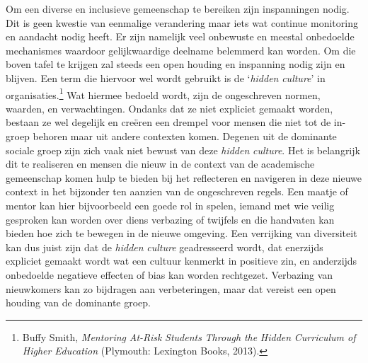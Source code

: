 \documentclass[smallauthor, chapterhaspagenum, nochapterinheader, pagenuminheader,  bigchapnum,medium2, tocpages,  garamond, titleinheader]{jote-book}
\begin{document}
	Om een diverse en inclusieve gemeenschap te bereiken zijn inspanningen nodig. Dit is geen kwestie van eenmalige verandering maar iets wat continue monitoring en aandacht nodig heeft. Er zijn namelijk veel onbewuste en meestal onbedoelde mechanismes waardoor gelijkwaardige deelname belemmerd kan worden. Om die boven tafel te krijgen zal steeds een open houding en inspanning nodig zijn en blijven. Een term die hiervoor wel wordt gebruikt is de ‘\emph{hidden}\emph{ culture}' in organisaties.\footnote{Buffy Smith, \emph{Mentoring}\emph{ At-Risk }\emph{Students}\emph{ Through }\emph{the}\emph{ }\emph{Hidden}\emph{ Curriculum of }\emph{Higher}\emph{ }\emph{Education}\emph{ }(Plymouth: Lexington Books, 2013).} Wat hiermee bedoeld wordt, zijn de ongeschreven normen, waarden, en verwachtingen. Ondanks dat ze niet expliciet gemaakt worden, bestaan ze wel degelijk en creëren een drempel voor mensen die niet tot de in-groep behoren maar uit andere contexten komen. Degenen uit de dominante sociale groep zijn zich vaak niet bewust van deze \emph{hidden}\emph{ culture}. Het is belangrijk dit te realiseren en mensen die nieuw in de context van de academische gemeenschap komen hulp te bieden bij het reflecteren en navigeren in deze nieuwe context in het bijzonder ten aanzien van de ongeschreven regels. Een maatje of mentor kan hier bijvoorbeeld een goede rol in spelen, iemand met wie veilig gesproken kan worden over diens verbazing of twijfels en die handvaten kan bieden hoe zich te bewegen in de nieuwe omgeving. Een verrijking van diversiteit kan dus juist zijn dat de \emph{hidden}\emph{ culture} geadresseerd wordt, dat enerzijds expliciet gemaakt wordt wat een cultuur kenmerkt in positieve zin, en anderzijds onbedoelde negatieve effecten of bias kan worden rechtgezet. Verbazing van nieuwkomers kan zo bijdragen aan verbeteringen, maar dat vereist een open houding van de dominante groep.
\end{document}
